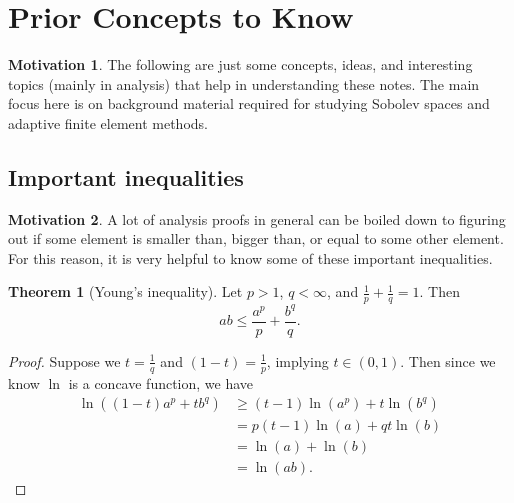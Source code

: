 \documentclass[11pt]{article}
\theoremstyle{definition}
\newtheorem*{theorem}{Theorem}
\newtheorem*{motivation}{Motivation}
\begin{document}
\pagestyle{fancy}
\fancyhead[L]{}
\fancyhead[R]{}
\tableofcontents
\newpage
\fancyhead[L]{\leftmark}
\fancyhead[R]{\rightmark}
\fancyhead[C]{}
\section{Prior Concepts to Know}
\begin{motivation}
The following are just some concepts, ideas, and interesting topics (mainly in analysis) that help in understanding these notes.
The main focus here is on background material required for studying Sobolev spaces and adaptive finite element methods.
\end{motivation}

\subsection{Important inequalities}
\begin{motivation}
A lot of analysis proofs in general can be boiled down to figuring out if some element is smaller than, bigger than, or equal to some other element.
For this reason, it is very helpful to know some of these important inequalities. 
\end{motivation}
\begin{theorem}[Young's inequality]
Let $p > 1$, $q < \infty$, and $\frac{1}{p}+\frac{1}{q} = 1$. Then
\[ab \leq \frac{a^p}{p} + \frac{b^q}{q}.\]
\end{theorem}
\begin{proof}
Suppose we $t = \frac{1}{q}$ and $(1-t)=\frac{1}{p}$, implying $t \in (0,1)$. Then since we know $\ln$ is a concave function, we have
	\begin{equation*}
		\begin{aligned}
			\ln{((1-t)a^p + tb^q)} &\geq (t-1)\ln{(a^p)} + t\ln{(b^q)} \\
					       &= p(t-1)\ln{(a)} + qt\ln{(b)} \\
					       &= \ln{(a)} + \ln{(b)} \\
					       &= \ln{(ab)}.
		\end{aligned}
	\end{equation*}
\end{proof}
\end{document}
